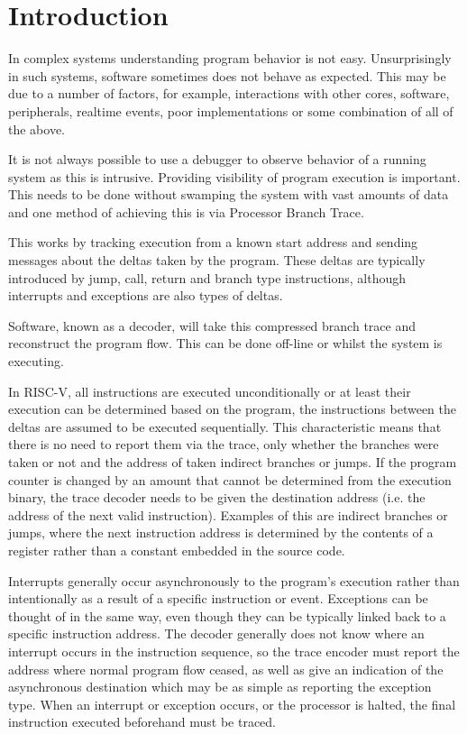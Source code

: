\chapter{Introduction}
\label{sec:intro}

In complex systems understanding program behavior is not easy.
Unsurprisingly in such systems, software sometimes does not behave as
expected. This may be due to a number of factors, for example,
interactions with other cores, software, peripherals, realtime
events, poor implementations or some combination of all of the above.

It is not always possible to use a debugger to observe behavior of a
running system as this is intrusive.  Providing visibility of program
execution is important.  This needs to be done without swamping the
system with vast amounts of data and one method of achieving this is
via Processor Branch Trace.

This works by tracking execution from a known start address and sending
messages about the deltas taken by the program. These deltas are typically
introduced by jump, call, return and branch type instructions,
although interrupts and exceptions are also types of deltas.

Software, known as a decoder, will take this compressed branch trace
and reconstruct the program flow. This can be done off-line or
whilst the system is executing.

In RISC-V, all instructions are executed unconditionally or at least
their execution can be determined based on the program, the
instructions between the deltas are assumed to be executed
sequentially.  This characteristic means that there is no need to
report them via the trace, only whether the branches were taken or not
and the address of taken indirect branches or jumps. If the program
counter is changed by an amount that cannot be determined from the
execution binary, the trace decoder needs to be given the destination
address (i.e. the address of the next valid instruction).  Examples of
this are indirect branches or jumps, where the next instruction
address is determined by the contents of a register rather than a
constant embedded in the source code.

Interrupts generally occur asynchronously to the program's execution
rather than intentionally as a result of a specific instruction or
event.  Exceptions can be thought of in the same way, even though they
can be typically linked back to a specific instruction address.  The
decoder generally does not know where an interrupt occurs in the
instruction sequence, so the trace encoder must report the address
where normal program flow ceased, as well as give an indication of the
asynchronous destination which may be as simple as reporting the
exception type.  When an interrupt or exception occurs, or the
processor is halted, the final instruction executed beforehand must be
traced.

